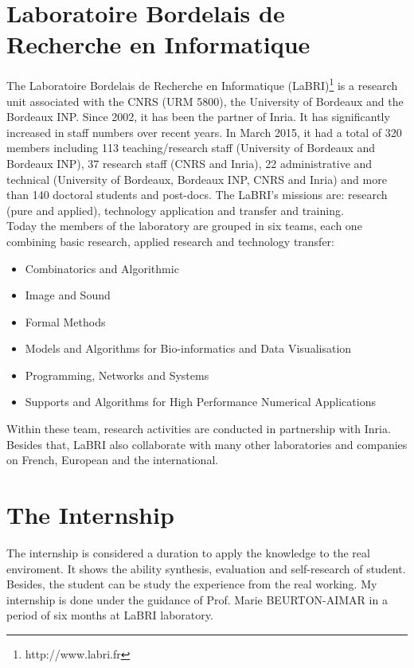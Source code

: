 \section{Laboratoire Bordelais de Recherche en Informatique}
The Laboratoire Bordelais de Recherche en Informatique (LaBRI)\footnote{http://www.labri.fr} is a research unit associated with the CNRS (URM 5800), the University of Bordeaux and the Bordeaux INP. Since 2002, it has been the partner of Inria. It has significantly increased in staff numbers over recent years. In March 2015, it had a total of 320 members including 113 teaching/research staff (University of Bordeaux and Bordeaux INP), 37 research staff (CNRS and Inria), 22 administrative and technical (University of Bordeaux, Bordeaux INP, CNRS and Inria) and more than 140 doctoral students and post-docs. The LaBRI's missions are: research (pure and applied), technology application and transfer and training.\\
Today the members of the laboratory are grouped in six teams, each one combining basic research, applied research and technology transfer:
\begin{itemize}
\item Combinatorics and Algorithmic
\item Image and Sound
\item Formal Methods
\item Models and Algorithms for Bio-informatics and Data Visualisation
\item Programming, Networks and Systems
\item Supports and Algorithms for High Performance Numerical Applications
\end{itemize} 
Within these team, research activities are conducted in partnership with Inria. Besides that, LaBRI also collaborate with many other laboratories and companies on French, European and the international.
\section{The Internship}
The internship is considered a duration to apply the knowledge to the real enviroment. It shows the ability synthesis, evaluation and self-research of student. Besides, the student can be study the experience from the real working. My internship is done under the guidance of Prof. Marie BEURTON-AIMAR in a period of six months at LaBRI laboratory.
